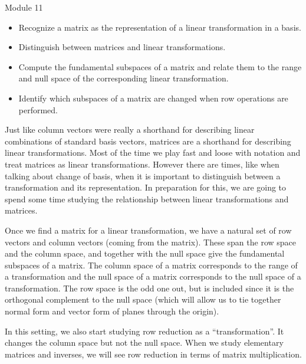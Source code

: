 \begin{lesson}

	Module 11

	\begin{itemize}
		\item Recognize a matrix as the representation of a linear transformation in a basis.
		\item Distinguish between matrices and linear transformations.
		\item Compute the fundamental subspaces of a matrix and relate them to the range and null space
			of the corresponding linear transformation.
		\item Identify which subspaces of a matrix are changed when row operations are performed.
	\end{itemize}

		Just like column vectors were really a shorthand for describing linear combinations
		of standard basis vectors,
		matrices are a shorthand for describing linear transformations. Most of the time we play fast
		and loose with notation and treat matrices as linear transformations. However there are times,
		like when talking about change of basis, when it is important to distinguish between
		a transformation and its representation. In preparation for this, we are going to spend some
		time studying the relationship between linear transformations and matrices.

		Once we find a matrix for a linear transformation, we have a natural set of row vectors and column
		vectors (coming from the matrix). These span the row space and the column space,
		and together with the null space give the fundamental subspaces of a matrix. The column space of
		a matrix corresponds to the range of a transformation and the null space of a matrix corresponds
		to the null space of a transformation. The row space is the odd one out, but is included since it is
		the orthogonal complement to the null space (which will allow us to tie together normal form and vector
		form of planes through the origin).

		In this setting, we also start studying row reduction as a ``transformation''. It changes
		the column space but not the null space. When we study elementary matrices and inverses, we will
		see row reduction in terms of matrix multiplication.

\end{lesson}

